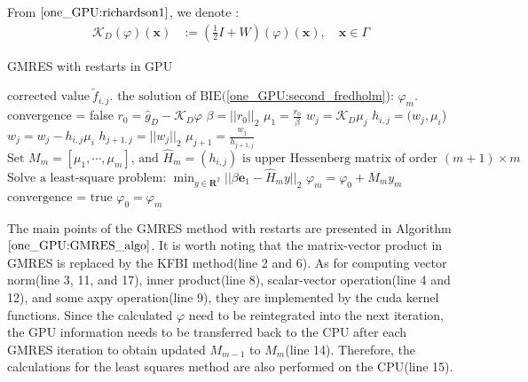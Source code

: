 From $\eqref{one_GPU:richardson1}$, we denote  : 
\begin{align}
    \mathcal{K}_{D}(\varphi)(\mathbf{x}) & := (\frac{1}{2}I + W)(\varphi)(\mathbf{x}), \quad \mathbf{x} \in \Gamma
\end{align}
\begin{algorithm}[ht]
\renewcommand{\algorithmicrequire}{\textbf{Input:}}
\renewcommand{\algorithmicensure}{\textbf{Output:}}
\caption{GMRES with restarts in GPU}
\begin{algorithmic}[1]
\Require $\text{corrected value} ~\tilde{f}_{i,j}$.
\Ensure $\text{the solution of BIE}($\ref{one_GPU:second_fredholm}): $\varphi_{m}$.
\State convergence = false
    \State $r_{0} = \hat{g}_{D} - \mathcal{K}_{D} \varphi$
    \State $\beta = ||r_{0}||_{2}$
    \State $\mu_{1} = \frac{r_{0}}{\beta}$
        \State $w_{j} = \mathcal{K}_{D}\mu_{j}$
            \State $h_{i,j} = (w_{j}, \mu_{i}$)
            \State $w_{j} = w_{j} - h_{i,j}\mu_{i}$
        \EndFor
        \State $h_{j+1, j} = ||w_{j}||_{2}$
        \State $\mu_{j+1} = \frac{w_{j}}{h_{j+1, j}}$
    \EndFor
    \State $\text{Set } M_{m} = [\mu_{1}, \cdots, \mu_{m}] \text{, and } \hat{H}_{m} = (h_{i,j}) \text{ is upper Hessenberg matrix of order } (m+1) \times m$
    \State $\text{Solve a least-square problem: } \min_{y\in \mathbf{R}^{2}}||\beta \mathbf{e}_{1} - \hat{H}_{m}y||_{2}$
    \State $\varphi_{m} = \varphi_{0} + M_{m}y_{m}$
    \State $\text{convergence = true}$
    \EndIf
    \State $\varphi_{0} = \varphi_{m}$
\EndWhile
\end{algorithmic}\label{one_GPU:GMRES_algo}
\end{algorithm}
The main points of the GMRES method with restarts are presented in Algorithm $\ref{one_GPU:GMRES_algo}$. It is worth noting that the matrix-vector product in GMRES is replaced by the KFBI method(line 2 and 6). As for computing vector norm(line 3, 11, and 17), inner product(line 8), scalar-vector operation(line 4 and 12), and some axpy operation(line 9), they are implemented by the cuda kernel functions. Since the calculated $\varphi$ need to be reintegrated into the next iteration, the GPU information needs to be transferred back to the CPU after each GMRES iteration to obtain updated $M_{m-1}$ to $M_{m}$(line 14). Therefore, the calculations for the least squares method are also performed on the CPU(line 15).